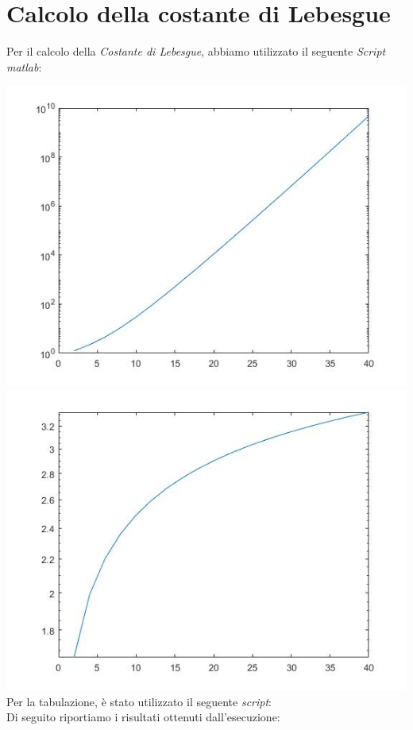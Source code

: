 \section*{Calcolo della costante di Lebesgue}
Per il calcolo della \emph{Costante di Lebesgue}, abbiamo utilizzato il seguente \emph{Script matlab}: 

\includegraphics[width=1\linewidth]{img/19equidistanti.jpg}
\includegraphics[width=1\linewidth]{img/19cheb.jpg}
\newpage
Per la tabulazione, è stato utilizzato il seguente \emph{script}:\\

Di seguito riportiamo i risultati ottenuti dall'esecuzione:\\ \\
